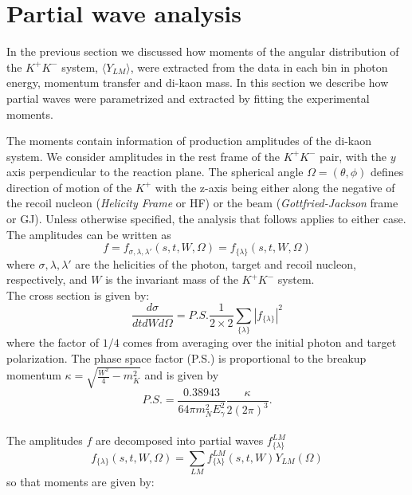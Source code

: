 \documentclass[twocolumn,superscriptaddress,prd]{revtex4}
\begin{document}
\section{\label{sec:disp} Partial wave analysis}
In the previous section we discussed how moments of the angular distribution of the $K^+K^-$ system, 
$\langle Y_{LM} \rangle$,  were extracted from the data in each bin in photon  energy, momentum transfer and di-kaon mass. 
In this section we describe how partial waves were parametrized and extracted by fitting the experimental moments.

The moments contain information of production amplitudes of the di-kaon system. We consider amplitudes in the rest frame of the $K^+  K^-$ pair, with the $y$ axis perpendicular to the reaction plane. The spherical angle $\Omega = (\theta,\phi)$ defines direction of motion of the $K^+$ with the z-axis being either along the negative of the recoil nucleon ({\it Helicity Frame} or HF) or the beam ({\it Gottfried-Jackson} frame or GJ). Unless otherwise specified, the analysis that follows applies to either case.\\
The amplitudes can be written as
\begin{equation} 
f = f_{\sigma,\lambda,\lambda'}(s,t,W,\Omega )= f_{\{\lambda\}}(s,t,W,\Omega) 
\end{equation} 
where $\sigma,\lambda,\lambda'$ are the helicities of the photon, target and recoil nucleon, respectively, and $W$ is the invariant mass of the $K^+ K^-$ system. \\
The cross section is given by: 
\begin{equation} 
\frac{d\sigma}{d t d W d \Omega} = P.S. \frac{1}{2\times 2}\sum_{\{\lambda\}} |f_{\{\lambda\}}|^2
\end{equation} 
where the factor of $1/4$ comes from averaging over the initial photon and target polarization. The phase space factor (P.S.) is proportional to the breakup momentum $\kappa = \sqrt{\frac{W^2}{4} - m_{K}^2} $ and is given by
\begin{equation} 
P.S. =  \frac{0.38943}{64 \pi m_{N}^2E_{\gamma}^2} \frac{\kappa}{2(2\pi)^3}.
\end{equation} \\
\noindent
The amplitudes $f$ are decomposed into partial waves $f^{LM}_{\{\lambda\}}$
\begin{equation} 
 f_{\{\lambda\}}(s,t,W,\Omega)  = \sum_{LM}  f^{LM}_{\{\lambda\}}(s,t,W) Y_{LM}(\Omega) 
 \label{pws}
 \end{equation}
 so that moments are given by:
 
\end{document}
